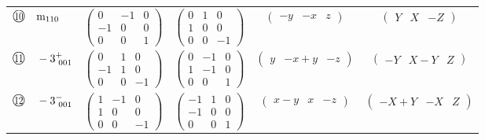 \documentclass[fleqn,10pt,landscape]{jsarticle}
\begin{document}
\begin{center}
\begin{longtable}{lcccc}
$ {\ooalign{\hfil\resizebox{.8\width}{\height}{10}\hfil\crcr\raise.1ex\hbox{\large$\bigcirc$}}}\quad {\rm m}_{110} $ & $ \begin{pmatrix} 0 & -1 & 0 \\ -1 & 0 & 0 \\ 0 & 0 & 1 \end{pmatrix} $ & $ \begin{pmatrix} 0 & 1 & 0 \\ 1 & 0 & 0 \\ 0 & 0 & -1 \end{pmatrix} $ & $ \begin{pmatrix} - y & - x & z \end{pmatrix} $ & $ \begin{pmatrix} Y & X & - Z \end{pmatrix} $ \\
$ {\ooalign{\hfil\resizebox{.8\width}{\height}{11}\hfil\crcr\raise.1ex\hbox{\large$\bigcirc$}}}\quad -3^{+}_{\,\,001} $ & $ \begin{pmatrix} 0 & 1 & 0 \\ -1 & 1 & 0 \\ 0 & 0 & -1 \end{pmatrix} $ & $ \begin{pmatrix} 0 & -1 & 0 \\ 1 & -1 & 0 \\ 0 & 0 & 1 \end{pmatrix} $ & $ \begin{pmatrix} y & - x + y & - z \end{pmatrix} $ & $ \begin{pmatrix} - Y & X - Y & Z \end{pmatrix} $ \\
$ {\ooalign{\hfil\resizebox{.8\width}{\height}{12}\hfil\crcr\raise.1ex\hbox{\large$\bigcirc$}}}\quad -3^{-}_{\,\,001} $ & $ \begin{pmatrix} 1 & -1 & 0 \\ 1 & 0 & 0 \\ 0 & 0 & -1 \end{pmatrix} $ & $ \begin{pmatrix} -1 & 1 & 0 \\ -1 & 0 & 0 \\ 0 & 0 & 1 \end{pmatrix} $ & $ \begin{pmatrix} x - y & x & - z \end{pmatrix} $ & $ \begin{pmatrix} - X + Y & - X & Z \end{pmatrix} $ \\
\end{longtable}
\end{center}
\end{document}
